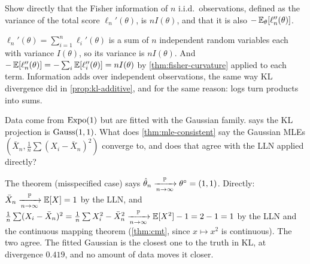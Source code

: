 \begin{exercise}
\label{ex:mle-information-additive}
Show directly that the Fisher information of $n$ i.i.d.\ observations, defined as the variance of the total score $\ell_n'(\theta)$, is $nI(\theta)$, and that it is also $-\operatorname*{\mathbb{E}}_\theta[\ell_n''(\theta)]$.
\end{exercise}
\begin{solution}
$\ell_n'(\theta) = \sum_{i=1}^n \ell_i'(\theta)$ is a sum of $n$ independent random variables each with variance $I(\theta)$, so its variance is $nI(\theta)$. And $-\operatorname*{\mathbb{E}}[\ell_n''(\theta)] = -\sum_i\operatorname*{\mathbb{E}}[\ell_i''(\theta)] = nI(\theta)$ by \cref{thm:fisher-curvature} applied to each term. Information adds over independent observations, the same way KL divergence did in \cref{prop:kl-additive}, and for the same reason: logs turn products into sums.
\end{solution}

\begin{exercise}
\label{ex:mle-misspecified}
Data come from $\text{Expo}(1)$ but are fitted with the Gaussian family.  says the KL projection is $\text{Gauss}(1, 1)$. What does \cref{thm:mle-consistent} say the Gaussian MLEs $(\bar{X}_n, \frac1n\sum(X_i - \bar{X}_n)^2)$ converge to, and does that agree with the LLN applied directly?
\end{exercise}
\begin{solution}
The theorem (misspecified case) says $\hat{\theta}_n \xrightarrow [n \to \infty ]{\mathbb{P}} \theta^\circ = (1, 1)$. Directly: $\bar{X}_n \xrightarrow [n \to \infty ]{\mathbb{P}} \operatorname*{\mathbb{E}}[X] = 1$ by the LLN, and $\frac1n\sum(X_i - \bar{X}_n)^2 = \frac1n\sum X_i^2 - \bar{X}_n^2 \xrightarrow [n \to \infty ]{\mathbb{P}} \operatorname*{\mathbb{E}}[X^2] - 1 = 2 - 1 = 1$ by the LLN and the continuous mapping theorem (\cref{thm:cmt}, since $x \mapsto x^2$ is continuous). The two agree. The fitted Gaussian is the closest one to the truth in KL, at divergence $0.419$, and no amount of data moves it closer.
\end{solution}

